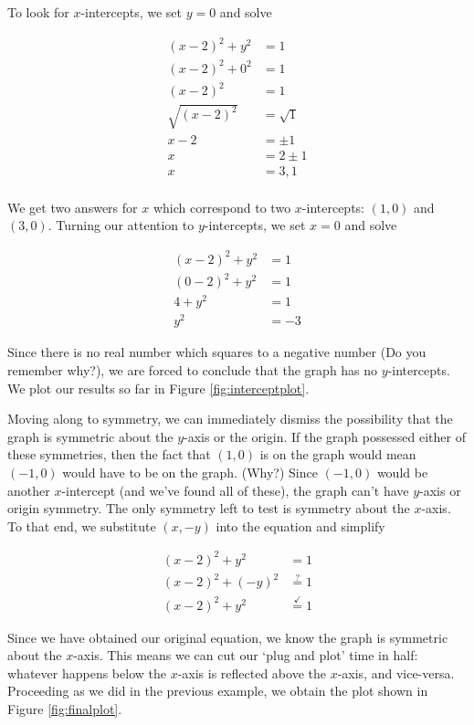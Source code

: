 {
To look for $x$-intercepts, we set $y=0$ and solve

\begin{align*}
(x-2)^2 + y^2 & =  1  \\ 
(x-2)^2 + 0^2 & =  1  \\ 
(x-2)^2 & =  1  \\
\sqrt{(x-2)^2} & =  \sqrt{1}  \tag*{extract square roots}\\
x - 2 & =  \pm 1  \\
x  & =  2 \pm 1  \\
x  & =  3, 1  \\
\end{align*}

We get two answers for $x$ which correspond to two $x$-intercepts:  $(1,0)$ and $(3,0)$.    Turning our attention to $y$-intercepts, we set $x=0$ and solve

\begin{align*}
(x-2)^2 + y^2 & =  1  \\ 
(0-2)^2 + y^2 & =  1  \\ 
4 + y^2 & =  1  \\
y^2 & =  -3 
\end{align*}

Since there is no real number which squares to a negative number (Do you remember why?), we are forced to conclude that the graph has no $y$-intercepts. We plot our results so far in Figure \ref{fig:interceptplot}.


Moving along to symmetry, we can immediately dismiss the possibility that the graph is symmetric about the $y$-axis or the origin.  If the graph possessed either of these symmetries, then the fact that $(1,0)$ is on the graph would mean $(-1,0)$ would have to be on the graph. (Why?)  Since $(-1,0)$ would be another $x$-intercept (and we've found all of these), the graph can't have $y$-axis or origin symmetry.  The only symmetry left to test is symmetry about the $x$-axis.   To that end, we substitute $(x,-y)$ into the equation and simplify

\begin{align*}
(x-2)^2 + y^2 & =  1  \\ 
(x-2)^2 + (-y)^2 & \stackrel{?}{=}  1  \\ 
(x-2)^2 + y^2 & \stackrel{\checkmark}{=}  1 
\end{align*}

Since we have obtained our original equation, we know the graph is symmetric about the $x$-axis.  This means we can cut our `plug and plot' time in half:  whatever happens below the $x$-axis is reflected above the $x$-axis, and vice-versa.  Proceeding as we did in the previous example, we obtain the plot shown in Figure \ref{fig:finalplot}.

}

